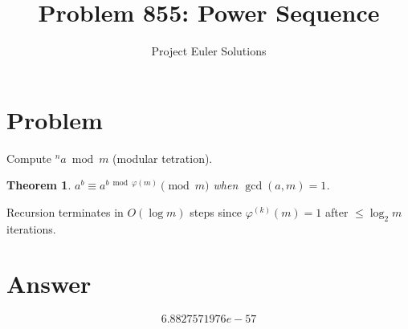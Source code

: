 \documentclass[11pt]{article}
\title{Problem 855: Power Sequence}
\author{Project Euler Solutions}
\date{}
\newtheorem{theorem}{Theorem}
\begin{document}
\maketitle
\section{Problem}
Compute ${}^n a \bmod m$ (modular tetration).
\begin{theorem}
$a^b \equiv a^{b \bmod \varphi(m)} \pmod{m}$ when $\gcd(a,m)=1$.
\end{theorem}
Recursion terminates in $O(\log m)$ steps since $\varphi^{(k)}(m) = 1$ after $\le \log_2 m$ iterations.
\section{Answer}

\[
\boxed{6.8827571976e-57}
\]
\end{document}
